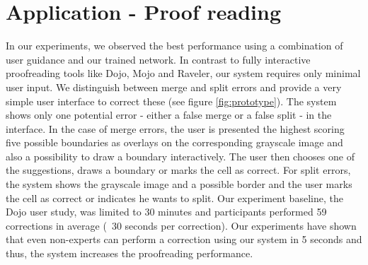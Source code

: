 \section{Application - Proof reading}

In our experiments, we observed the best performance using a combination of user guidance and our trained network. In contrast to fully interactive proofreading tools like Dojo, Mojo and Raveler, our system requires only minimal user input. We distinguish between merge and split errors and provide a very simple user interface to correct these (see figure \ref{fig:prototype}).
The system shows only one potential error - either a false merge or a false split - in the interface. In the case of merge errors, the user is presented the highest scoring five possible boundaries as overlays on the corresponding grayscale image and also a possibility to draw a boundary interactively. The user then chooses one of the suggestions, draws a boundary or marks the cell as correct.  For split errors, the system shows the grayscale image and a possible border and the user marks the cell as correct or indicates he wants to split. Our experiment baseline, the Dojo user study, was limited to 30 minutes and participants performed 59 corrections in average (~30 seconds per correction). Our experiments have shown that even non-experts can perform a correction using our system in 5 seconds and thus, the system increases the proofreading performance.

